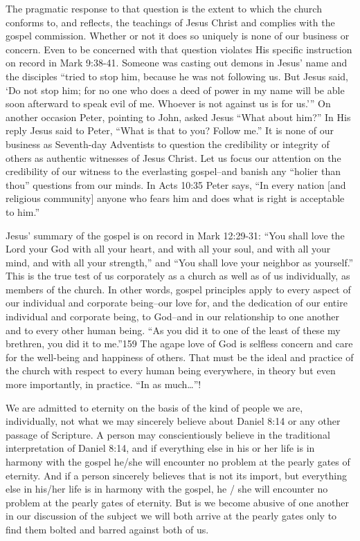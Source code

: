 The pragmatic response to that question is the extent to which the church
conforms to, and reflects, the teachings of Jesus Christ and complies with
the gospel commission. Whether or not it does so uniquely is none of our
business or concern. Even to be concerned with that question violates His
specific instruction on record in Mark 9:38-41. Someone was casting out
demons in Jesus' name and the disciples ``tried to stop him, because he was
not following us. But Jesus said, `Do not stop him; for no one who does a
deed of power in my name will be able soon afterward to speak evil of me.
Whoever is not against us is for us.''' On another occasion Peter, pointing
to John, asked Jesus ``What about him?'' In His reply Jesus said to Peter,
``What is that to you? Follow me.'' It is none of our business as Seventh-day
Adventists to question the credibility or integrity of others as authentic
witnesses of Jesus Christ. Let us focus our attention on the credibility of
our witness to the everlasting gospel--and banish any ``holier than thou''
questions from our minds. In Acts 10:35 Peter says, ``In every nation [and
religious community] anyone who fears him and does what is right is
acceptable to him.''

Jesus' summary of the gospel is on record in Mark 12:29-31: ``You shall love
the Lord your God with all your heart, and with all your soul, and with all
your mind, and with all your strength,'' and ``You shall love your neighbor as
yourself.'' This is the true test of us corporately as a church as well as of
us individually, as members of the church. In other words, gospel principles
apply to every aspect of our individual and corporate being--our love for,
and the dedication of our entire individual and corporate being, to 
God--and in our relationship to one another and to every other human being.
``As you did it to one of the least of these my brethren, you did it to
me.''159 The agape love of God is selfless concern and care for the
well-being and happiness of others. That must be the ideal and practice of
the church with respect to every human being everywhere, in theory but even
more importantly, in practice. ``In as much\ldots''!

We are admitted to eternity on the basis of the kind of people we are,
individually, not what we may sincerely believe about Daniel 8:14 or any
other passage of Scripture. A person may conscientiously believe in the
traditional interpretation of Daniel 8:14, and if everything else in his or
her life is in harmony with the gospel he/she will encounter no problem at
the pearly gates of eternity. And if a person sincerely believes that is not
its import, but everything else in his/her life is in harmony with the
gospel, he / she will encounter no problem at the pearly gates of eternity.
But is we become abusive of one another in our discussion of the subject we
will both arrive at the pearly gates only to find them bolted and barred
against both of us.

